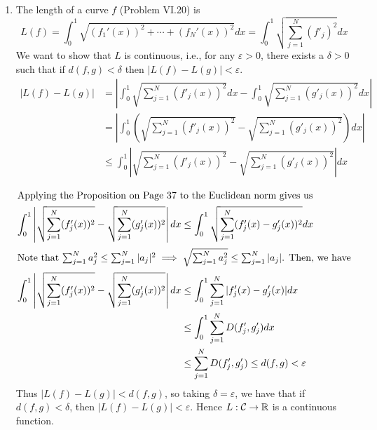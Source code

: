 \documentclass[12pt]{article}
\begin{document}
\begin{solution}
\begin{enumerate}
        \item [(b)] The length of a curve $f$ (Problem VI.20) is 
        \[L(f) = \int_0^1 \sqrt{\left(f_1'(x)\right)^2 + \cdots + \left(f_N'(x)\right)^2}dx = \int_0^1\sqrt{\sum_{j=1}^N(f'_j)^2}dx\]
        We want to show that $L$ is continuous, i.e., for any $\varepsilon > 0$, there exists a $\delta > 0$ such that if $d(f, g) < \delta$ then $|L(f) - L(g)| < \varepsilon$. 
        \begin{align*}
            |L(f) - L(g)| &= \left|\int_0^1\sqrt{\sum_{j=1}^N(f'_j(x))^2}dx - \int_0^1\sqrt{\sum_{j=1}^N(g'_j(x))^2}dx\right| \\ 
            &= \left|\int_0^1 \left(\sqrt{\sum_{j=1}^N(f'_j(x))^2} - \sqrt{\sum_{j=1}^N(g'_j(x))^2}\right)dx\right| \\ 
            &\leq \int_0^1 \left|\sqrt{\sum_{j=1}^N(f'_j(x))^2}- \sqrt{\sum_{j=1}^N(g'_j(x))^2}\right|dx \\ 
        \end{align*}
        \begin{align*}
        \intertext{Applying the Proposition on Page 37 to the Euclidean norm gives us}
            \int_0^1 \left|\sqrt{\sum_{j=1}^N(f'_j(x))^2} - \sqrt{\sum_{j=1}^N(g'_j(x))^2}\right|dx 
            &\leq \int_0^1 \sqrt{\sum_{j=1}^N(f'_j(x)- g'_j(x))^2} dx \\ 
        \intertext{Note that  $\sum_{j=1}^Na_j^2 \leq \sum_{j=1}^N |a_j|^2 \implies \sqrt{\sum_{j=1}^Na_j^2} \leq \sum_{j=1}^N |a_j|$. Then, we have}
        \int_0^1 \left|\sqrt{\sum_{j=1}^N(f'_j(x))^2} - \sqrt{\sum_{j=1}^N(g'_j(x))^2}\right|dx 
            &\leq \int_0^1 {\sum_{j=1}^N|f'_j(x)- g'_j(x)|} dx \\ 
            &\leq \int_0^1 \sum_{j=1}^N D(f'_j, g_j') dx \\ 
            &\leq \sum_{j=1}^N D(f'_j, g_j') \leq d(f, g) < \varepsilon
        \end{align*}
        Thus $|L(f) - L(g)| < d(f,g)$, so taking $\delta = \varepsilon$, we have that if $d(f, g) < \delta$, then $|L(f) - L(g)| < \varepsilon$. Hence $L: \mathcal{C} \to \mathbb R$ is a continuous function. 
    \end{enumerate}
\end{solution}
\end{document}
